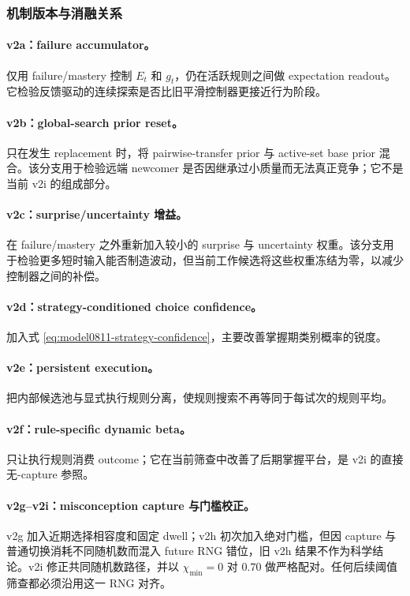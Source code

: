 \subsubsection{机制版本与消融关系}

\paragraph{v2a：failure accumulator。}
仅用 failure/mastery 控制 $E_t$ 和 $g_t$，仍在活跃规则之间做 expectation readout。它检验反馈驱动的连续探索是否比旧平滑控制器更接近行为阶段。

\paragraph{v2b：global-search prior reset。}
只在发生 replacement 时，将 pairwise-transfer prior 与 active-set base prior 混合。该分支用于检验远端 newcomer 是否因继承过小质量而无法真正竞争；它不是当前 v2i 的组成部分。

\paragraph{v2c：surprise/uncertainty 增益。}
在 failure/mastery 之外重新加入较小的 surprise 与 uncertainty 权重。该分支用于检验更多短时输入能否制造波动，但当前工作候选将这些权重冻结为零，以减少控制器之间的补偿。

\paragraph{v2d：strategy-conditioned choice confidence。}
加入式 \ref{eq:model0811-strategy-confidence}，主要改善掌握期类别概率的锐度。

\paragraph{v2e：persistent execution。}
把内部候选池与显式执行规则分离，使规则搜索不再等同于每试次的规则平均。

\paragraph{v2f：rule-specific dynamic beta。}
只让执行规则消费 outcome；它在当前筛查中改善了后期掌握平台，是 v2i 的直接无-capture 参照。

\paragraph{v2g--v2i：misconception capture 与门槛校正。}
v2g 加入近期选择相容度和固定 dwell；v2h 初次加入绝对门槛，但因 capture 与普通切换消耗不同随机数而混入 future RNG 错位，旧 v2h 结果不作为科学结论。v2i 修正共同随机数路径，并以
$\chi_{\min}=0$ 对 $0.70$ 做严格配对。任何后续阈值筛查都必须沿用这一 RNG 对齐。


